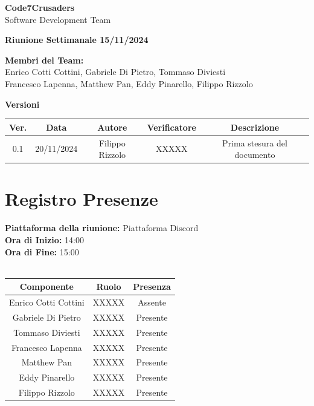 \documentclass{article}
\begin{document}
\begin{titlepage}
    {\Huge \textbf{Code7Crusaders}}\\
    \vspace{0.5cm}
    {\Large Software Development Team}\\
    \vspace{2cm}
    
    {\large \textbf{Riunione Settimanale 15/11/2024}}\\
    \vspace{5cm}

    \textbf{Membri del Team:}\\
    Enrico Cotti Cottini, Gabriele Di Pietro, Tommaso Diviesti \\
    Francesco Lapenna, Matthew Pan, Eddy Pinarello, Filippo Rizzolo \\
    \vspace{0.5cm}
    
    \vspace{1cm}
\end{titlepage}

\newpage
\begin{table}[h!]
\centering
\textbf{Versioni} \\ %
\vspace{2mm} %
\begin{tabular}{|c|c|c|c|c|}
    \hline
    \textbf{Ver.} & \textbf{Data} & \textbf{Autore} & \textbf{Verificatore} & \textbf{Descrizione} \\
    \hline
    0.1 & 20/11/2024 & Filippo Rizzolo & XXXXX & Prima stesura del documento \\ 
    \hline
\end{tabular}
\end{table}

\newpage
\tableofcontents

\newpage
\section{Registro Presenze}
\textbf{Piattaforma della riunione:} Piattaforma Discord \\
\textbf{Ora di Inizio:} 14:00\\
\textbf{Ora di Fine:} 15:00\\
\\
\begin{tabular}{|c|c|c|}
    \hline
    \textbf{Componente} & \textbf{Ruolo} & \textbf{Presenza}\\
    \hline
    Enrico Cotti Cottini & XXXXX & Assente \\ 
    \hline
    Gabriele Di Pietro & XXXXX & Presente\\ 
    \hline
    Tommaso Diviesti & XXXXX & Presente \\ 
    \hline 
    Francesco Lapenna & XXXXX & Presente \\ 
    \hline
    Matthew Pan & XXXXX & Presente\\ 
    \hline 
    Eddy Pinarello & XXXXX & Presente \\ 
    \hline 
    Filippo Rizzolo & XXXXX & Presente \\ 
    \hline 
\end{tabular}
\vspace{3cm}
\end{document}
